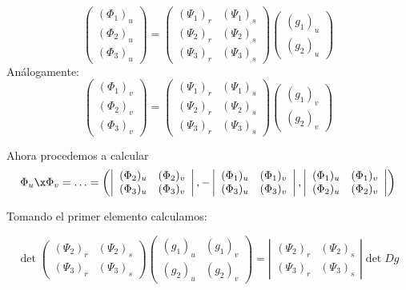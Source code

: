 \[\begin{pmatrix}
(\Phi_1)_u\\(\Phi_2)_u\\(\Phi_3)_u
\end{pmatrix} = \begin{pmatrix}
(\Psi_1)_r & (\Psi_1)_s\\
(\Psi_2)_r & (\Psi_2)_s\\
(\Psi_3)_r & (\Psi_3)_s
\end{pmatrix}\begin{pmatrix}
(g_1)_u\\
(g_2)_u
\end{pmatrix}
\]
Análogamente:
\[\begin{pmatrix}
(\Phi_1)_v\\(\Phi_2)_v\\(\Phi_3)_v
\end{pmatrix} = \begin{pmatrix}
(\Psi_1)_r & (\Psi_1)_s\\
(\Psi_2)_r & (\Psi_2)_s\\
(\Psi_3)_r & (\Psi_3)_s
\end{pmatrix}\begin{pmatrix}
(g_1)_v\\
(g_2)_v
\end{pmatrix}
\]

Ahora procedemos a calcular
\[\Phi_u\x\Phi_v = \dotsc = \left(
\left|\begin{array}{cc}
(\Phi_2)_u & (\Phi_2)_v\\
(\Phi_3)_u & (\Phi_3)_v
\end{array}
\right|,-
\left|\begin{array}{cc}
(\Phi_1)_u & (\Phi_1)_v\\
(\Phi_3)_u & (\Phi_3)_v
\end{array}
\right|,
\left|\begin{array}{cc}
(\Phi_1)_u & (\Phi_1)_v\\
(\Phi_2)_u & (\Phi_2)_v
\end{array}
\right|
\right)\]

Tomando el primer elemento calculamos:

\[
\det\left(
\begin{array}{cc}
(\Psi_2)_r & (\Psi_2)_s\\
(\Psi_3)_r & (\Psi_3)_s
\end{array}
\right)\begin{pmatrix}
(g_1)_u &(g_1)_v \\
(g_2)_u & (g_2)_v
\end{pmatrix} =
\left| \begin{array}{cc}
(\Psi_2)_r & (\Psi_2)_s\\
(\Psi_3)_r & (\Psi_3)_s
\end{array}\right| \det Dg
\]

